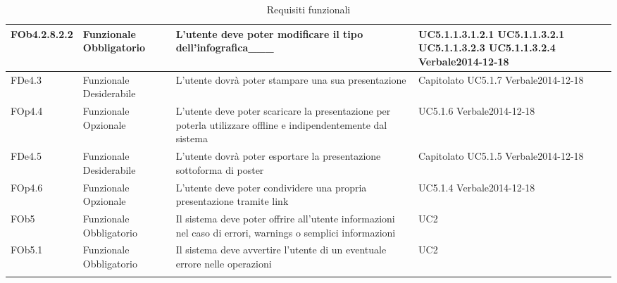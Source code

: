 \begin{longtable}{|l|p{2.5cm}|p{5cm}|p{3.5cm}|}
\hline
FOb4.2.8.2.2 & Funzionale \linebreak Obbligatorio & L'utente deve poter modificare il tipo dell'infografica___ & UC5.1.1.3.1.2.1 \linebreak  UC5.1.1.3.2.1 \linebreak  UC5.1.1.3.2.3 \linebreak  UC5.1.1.3.2.4 \linebreak  Verbale2014-12-18 \linebreak  \\
\hline
FDe4.3 & Funzionale \linebreak Desiderabile & L'utente dovrà poter stampare una sua presentazione & Capitolato \linebreak  UC5.1.7 \linebreak  Verbale2014-12-18 \linebreak  \\
\hline
FOp4.4 & Funzionale \linebreak Opzionale & L'utente deve poter scaricare la presentazione per poterla utilizzare offline e indipendentemente dal sistema & UC5.1.6 \linebreak  Verbale2014-12-18 \linebreak  \\
\hline
FDe4.5 & Funzionale \linebreak Desiderabile & L'utente dovrà poter esportare la presentazione sottoforma di poster & Capitolato \linebreak  UC5.1.5 \linebreak  Verbale2014-12-18 \linebreak  \\
\hline
FOp4.6 & Funzionale \linebreak Opzionale & L'utente deve poter condividere una propria presentazione tramite link & UC5.1.4 \linebreak  Verbale2014-12-18 \linebreak  \\
\hline
FOb5 & Funzionale \linebreak Obbligatorio & Il sistema deve poter offrire all'utente informazioni nel caso di errori, warnings o semplici informazioni & UC2 \linebreak \\
\hline
FOb5.1 & Funzionale \linebreak Obbligatorio & Il sistema deve avvertire l'utente di un eventuale errore nelle operazioni & UC2 \linebreak  \\
\hline
\caption{Requisiti funzionali}
\end{longtable}
